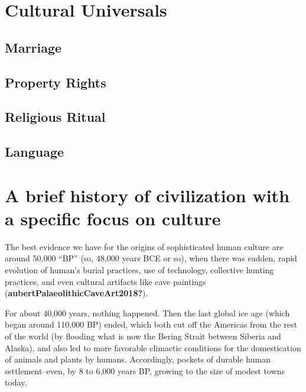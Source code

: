\documentclass[
  letterpaper,
  DIV=11,
  numbers=noendperiod,
  oneside]{scrartcl}
\begin{document}
\section{Cultural Universals}\label{cultural-universals}

\subsection{Marriage}\label{marriage}

\subsection{Property Rights}\label{property-rights}

\subsection{Religious Ritual}\label{religious-ritual}

\subsection{Language}\label{language}

\section{A brief history of civilization with a specific focus on
culture}\label{a-brief-history-of-civilization-with-a-specific-focus-on-culture}

The best evidence we have for the origins of sophisticated human culture
are around 50,000 ``BP'' (so, 48,000 years BCE or so), when there was
sudden, rapid evolution of human's burial practices, use of technology,
collective hunting practices, and even cultural artifacts like cave
paintings
(\textbf{aubertPalaeolithicCaveArt2018?}).

For about 40,000 years, nothing happened. Then the last global
ice age (which began around 110,000 BP) ended, which both cut off the
Americas from the rest of the world (by flooding what is now the Bering
Strait between Siberia and Alaska), and also led to more favorable
climactic conditions for the domestication of animals and plants by
humans. Accordingly, pockets of durable human settlement--even, by 8 to
6,000 years BP, growing to the size of modest towns today.
\end{document}
